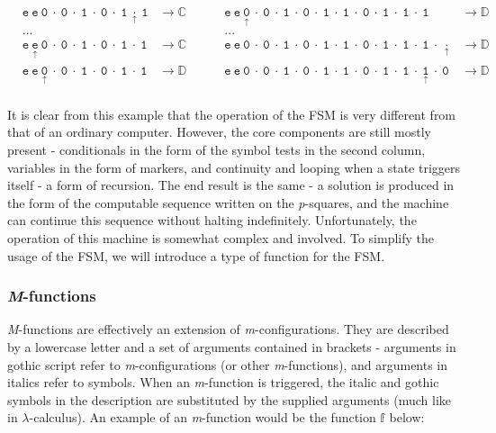 \documentclass[Master.tex]{subfiles}
\begin{document}
\begin{equation*}
\begin{aligned}
&\mathtt{e\ e\ 0\ \cdot\ 0\ \cdot\ 1\ \cdot\ 0\ \cdot\ 1\ \underset{\uparrow}{\cdot}\ 1} & \rightarrow \mathbb{C}\ \ \ \ \ \ \ \ \ \ & \mathtt{e\ e\ \underset{\uparrow}{0}\ \cdot\ 0\ \cdot\ 1\ \cdot\ 0\ \cdot\ 1\ \cdot\ 1\ \cdot\ 0\ \cdot\ 1\ \cdot\ 1\ \cdot\ 1} & \rightarrow \mathbb{D}\\
&...& &...&\\
&\mathtt{e\ \underset{\uparrow}{e}\ 0\ \cdot\ 0\ \cdot\ 1\ \cdot\ 0\ \cdot\ 1\ \cdot\ 1} & \rightarrow \mathbb{C}\ \ \ \ \ \ \ \ \ \ & \mathtt{e\ e\ 0\ \cdot\ 0\ \cdot\ 1\ \cdot\ 0\ \cdot\ 1\ \cdot\ 1\ \cdot\ 0\ \cdot\ 1\ \cdot\ 1\ \cdot\ 1\ \cdot\ \underset{\uparrow}{\cdot}} & \rightarrow \mathbb{D}\\
&\mathtt{e\ e\ \underset{\uparrow}{0}\ \cdot\ 0\ \cdot\ 1\ \cdot\ 0\ \cdot\ 1\ \cdot\ 1} & \rightarrow \mathbb{D}\ \ \ \ \ \ \ \ \ \ & \mathtt{e\ e\ 0\ \cdot\ 0\ \cdot\ 1\ \cdot\ 0\ \cdot\ 1\ \cdot\ 1\ \cdot\ 0\ \cdot\ 1\ \cdot\ 1\ \cdot\ \underset{\uparrow}{1}\ \cdot\ 0} & \rightarrow \mathbb{D}\\
\end{aligned}
\end{equation*}

\clearpage

It is clear from this example that the operation of the FSM is very different from that of an ordinary computer. However, the core components are still mostly present - conditionals in the form of the symbol tests in the second column, variables in the form of markers, and continuity and looping when a state triggers itself - a form of recursion. The end result is the same - a solution is produced in the form of the computable sequence written on the \textit{p}-squares, and the machine can continue this sequence without halting indefinitely. Unfortunately, the operation of this machine is somewhat complex and involved. To simplify the usage of the FSM, we will introduce a type of function for the FSM.

\subsubsection{\textit{M}-functions}\label{sec:mfunctions}

\textit{M}-functions are effectively an extension of \textit{m}-configurations. They are described by a lowercase letter and a set of arguments contained in brackets - arguments in gothic script refer to \textit{m}-configurations (or other \textit{m}-functions), and arguments in italics refer to symbols. When an \textit{m}-function is triggered, the italic and gothic symbols in the description are substituted by the supplied arguments (much like in $\lambda$-calculus). An example of an \textit{m}-function would be the function $\mathbb{f}$ below:
\end{document}

